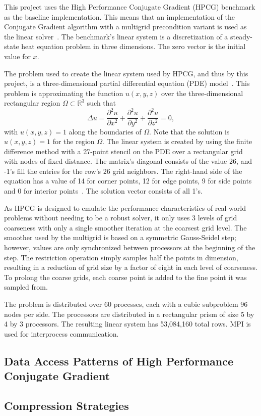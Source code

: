 This project uses the High Performance Conjugate Gradient (HPCG) benchmark as the baseline implementation.
This means that an implementation of the Conjugate Gradient algorithm with a multigrid precondition variant is used as the linear solver~\cite{Dongarra:2015:HPCG}.
The benchmark's linear system is a discretization of a steady-state heat equation problem in three dimensions.
The zero vector is the initial value for \(x\).

The problem used to create the linear system used by HPCG, and thus by this project, is a three-dimensional partial differential equation (PDE) model~\cite{Dongarra:2015:HPCG}.
This problem is approximating the function \(u(x, y, z)\) over the three-dimensional rectangular region \(\Omega\subset\mathbb{R}^3\) such that
\[
	\Delta u = \frac{\partial^2 u}{\partial x^2} + \frac{\partial^2 u}{\partial y^2} + \frac{\partial^2 u}{\partial z^2} = 0,
\] with \(u(x, y, z) = 1\) along the boundaries of \(\Omega\).
Note that the solution is \(u(x, y, z) = 1\) for the region \(\Omega\).
The linear system is created by using the finite difference method with a 27-point stencil on the PDE over a rectangular grid with nodes of fixed distance.
The matrix's diagonal consists of the value 26, and -1's fill the entries for the row's 26 grid neighbors.
The right-hand side of the equation has a value of 14 for corner points, 12 for edge points, 9 for side points and 0 for interior points~\cite{Kincaid:2009:Numerical}.
The solution vector consists of all 1's.

As HPCG is designed to emulate the performance characteristics of real-world problems without needing to be a robust solver, it only uses 3 levels of grid coarseness with only a single smoother iteration at the coarsest grid level.
The smoother used by the multigrid is based on a symmetric Gauss-Seidel step; however, values are only synchronized between processors at the beginning of the step.
The restriction operation simply samples half the points in dimension, resulting in a reduction of grid size by a factor of eight in each level of coarseness.
To prolong the coarse grids, each coarse point is added to the fine point it was sampled from.

The problem is distributed over 60 processes, each with a cubic subproblem 96 nodes per side.
The processors are distributed in a rectangular prism of size 5 by 4 by 3 processors.
The resulting linear system has 53,084,160 total rows.
MPI is used for interprocess communication.


\subsection{Data Access Patterns of High Performance Conjugate Gradient}
\label{sec:bg-da}


\subsection{Compression Strategies}
\label{sec:bg-comp}

